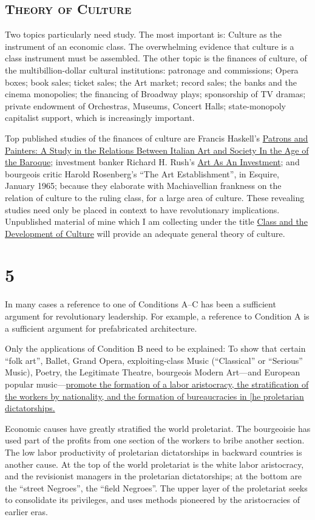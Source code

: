 \subsection*{\textsc{Theory of Culture}}
Two topics particularly need study. The most important is: Culture as the instrument of an economic class. The overwhelming evidence that culture is a class instrument must be assembled. The other topic is the finances of culture, of the multibillion-dollar cultural institutions: patronage and commissions; Opera boxes; book sales; ticket sales; the Art market; record sales; the banks and the cinema monopolies; the financing of Broadway plays; sponsorship of TV dramas; private endowment of Orchestras, Museums, Concert Halls; state-monopoly capitalist support, which is increasingly important. 

Top published studies of the finances of culture are Francis Haskell's \uline{Patrons and Painters: A Study in the Relations Between Italian Art and Society In the Age of the Baroque}; investment banker Richard H. Rush's \uline{Art As An Investment}; and bourgeois critic Harold Rosenberg's \enquote{The Art Establishment}, in Esquire, January 1965; because they elaborate with Machiavellian frankness on the relation of culture to the ruling class, for a large area of culture. These revealing studies need only be placed in context to have revolutionary implications. Unpublished material of mine which I am collecting under the title \uline{Class and the Development of Culture} will provide an adequate general theory of culture. 

\section{5}

In many cases a reference to one of Conditions A--C has been a sufficient argument for revolutionary leadership. For example, a reference to Condition A is a sufficient argument for prefabricated architecture. 

Only the applications of Condition B need to be explained: To show that certain \enquote{folk art}, Ballet, Grand Opera, exploiting-class Music (\enquote{Classical} or \enquote{Serious} Music), Poetry, the Legitimate Theatre, bourgeois Modern Art---and European popular music---\uline{promote the formation of a labor aristocracy, the stratification of the workers by nationality, and the formation of bureaucracies in [he proletarian dictatorships.}

Economic causes have greatly stratified the world proletariat. The bourgeoisie has used part of the profits from one section of the workers to bribe another section. The low labor productivity of proletarian dictatorships in backward countries is another cause. At the top of the world proletariat is the white labor aristocracy, and the revisionist managers in the proletarian dictatorships; at the bottom are the \enquote{street Negroes}, the \enquote{field Negroes}. The upper layer of the proletariat seeks to consolidate its privileges, and uses methods pioneered by the aristocracies of earlier eras. 


